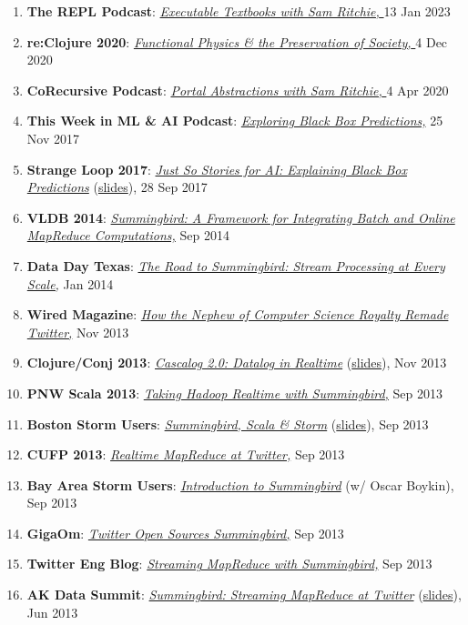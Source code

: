 \documentclass[letterpaper,11pt]{article}
\newcommand{\resumeItem}[2]{\item\small{
    \textbf{#1}{: #2 \vspace{-2pt}}
  }
}
\newcommand{\itlink}[2]{
  \href{#1}{\textit{#2}}
}
\begin{document}
\begin{enumerate}
  \resumeItem{The REPL Podcast}{\itlink{https://www.therepl.net/episodes/47/}{Executable Textbooks with Sam Ritchie, } 13 Jan 2023}
  \resumeItem{re:Clojure 2020}{\itlink{https://www.youtube.com/watch?v=8AxMp0nfN7s}{Functional Physics \& the Preservation of Society, } 4 Dec 2020}
  \resumeItem{CoRecursive Podcast}{\itlink{https://corecursive.com/050-sam-ritchie-portal-abstractions/}{Portal Abstractions with Sam Ritchie, } 4 Apr 2020}
  \resumeItem{This Week in ML \& AI Podcast}{\itlink{https://twimlai.com/twiml-talk-73-exploring-black-box-predictions-sam-ritchie/}{Exploring Black Box Predictions,} 25 Nov 2017}
  \resumeItem{Strange Loop 2017}{\itlink{https://www.youtube.com/watch?v=DiWkKqZChF0}{Just So Stories for AI: Explaining Black Box Predictions} (\href{https://speakerdeck.com/sritchie/just-so-stories-for-ai-explaining-black-box-predictions}{slides}), 28 Sep 2017}
  \resumeItem{VLDB 2014}{\itlink{http://www.vldb.org/pvldb/vol7/p1441-boykin.pdf}{Summingbird: A Framework for Integrating Batch and Online MapReduce Computations,} Sep 2014}
  \resumeItem{Data Day Texas}{\itlink{https://speakerdeck.com/sritchie/the-road-to-summingbird-stream-processing-at-every-scale}{The Road to Summingbird: Stream Processing at Every Scale,} Jan 2014}
  \resumeItem{Wired Magazine}{\itlink{http://www.wired.com/wiredenterprise/2013/11/twitter-summingbird/}{How the Nephew of Computer Science Royalty Remade Twitter,} Nov 2013}
  \resumeItem{Clojure/Conj 2013}{\itlink{http://www.youtube.com/watch?v=uuJW3EaN_3Q}{Cascalog 2.0: Datalog in Realtime}(\href{https://speakerdeck.com/sritchie/cascalog-2-dot-0-datalog-in-realtime}{slides}), Nov 2013}
  \resumeItem{PNW Scala 2013}{\itlink{http://www.youtube.com/watch?v=iuvauJZaMqA}{Taking Hadoop Realtime with Summingbird,} Sep 2013}
  \resumeItem{Boston Storm Users}{\itlink{https://vimeo.com/75516079}{Summingbird, Scala \& Storm}(\href{https://speakerdeck.com/sritchie/boston-storm-users-summingbird-scala-and-storm}{slides}), Sep 2013}
  \resumeItem{CUFP 2013}{\itlink{https://speakerdeck.com/sritchie/summingbird-at-cufp}{Realtime MapReduce at Twitter,} Sep 2013}
  \resumeItem{Bay Area Storm Users}{\itlink{http://www.youtube.com/watch?v=23scdoxHOLg}{Introduction to Summingbird} (w/ Oscar Boykin), Sep 2013}
  \resumeItem{GigaOm}{\itlink{http://gigaom.com/2013/09/03/twitter-open-sources-storm-hadoop-hybrid-called-summingbird/}{Twitter Open Sources Summingbird,} Sep 2013}
  \resumeItem{Twitter Eng Blog}{\itlink{https://blog.twitter.com/2013/streaming-mapreduce-with-summingbird}{Streaming MapReduce with Summingbird,} Sep 2013}
  \resumeItem{AK Data Summit}{\itlink{http://www.youtube.com/watch?v=Y3PETLJeP7o}{Summingbird: Streaming MapReduce at Twitter}(\href{https://speakerdeck.com/sritchie/summingbird-streaming-mapreduce-at-twitter}{slides}), Jun 2013}
\end{enumerate}

\end{document}
